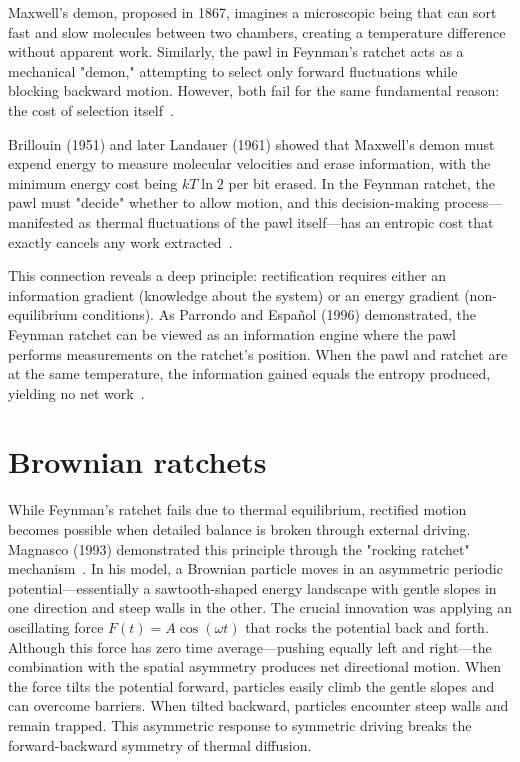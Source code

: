 Maxwell's demon, proposed in 1867, imagines a microscopic being that can sort fast and slow molecules between two chambers, creating a temperature difference without apparent work. Similarly, the pawl in Feynman's ratchet acts as a mechanical "demon," attempting to select only forward fluctuations while blocking backward motion. However, both fail for the same fundamental reason: the cost of selection itself~\cite{maxwell1871theory, maxwell1867letter}.

Brillouin (1951) and later Landauer (1961) showed that Maxwell's demon must expend energy to measure molecular velocities and erase information, with the minimum energy cost being $kT\ln{2}$ per bit erased. In the Feynman ratchet, the pawl must "decide" whether to allow motion, and this decision-making process—manifested as thermal fluctuations of the pawl itself—has an entropic cost that exactly cancels any work extracted~\cite{brillouin1951maxwell, landauer1961irreversibility}.

This connection reveals a deep principle: rectification requires either an information gradient (knowledge about the system) or an energy gradient (non-equilibrium conditions). As Parrondo and Español (1996) demonstrated, the Feynman ratchet can be viewed as an information engine where the pawl performs measurements on the ratchet's position. When the pawl and ratchet are at the same temperature, the information gained equals the entropy produced, yielding no net work~\cite{parrondo1996criticism}.


\section{Brownian ratchets}
\label{sct:brownianratchets}

While Feynman's ratchet fails due to thermal equilibrium, rectified motion becomes possible when detailed balance is broken through external driving. Magnasco (1993) demonstrated this principle through the "rocking ratchet" mechanism~\cite{magnasco1993forced}. In his model, a Brownian particle moves in an asymmetric periodic potential—essentially a sawtooth-shaped energy landscape with gentle slopes in one direction and steep walls in the other.
The crucial innovation was applying an oscillating force $F(t) = A\cos(\omega t)$ that rocks the potential back and forth. Although this force has zero time average—pushing equally left and right—the combination with the spatial asymmetry produces net directional motion. When the force tilts the potential forward, particles easily climb the gentle slopes and can overcome barriers. When tilted backward, particles encounter steep walls and remain trapped. This asymmetric response to symmetric driving breaks the forward-backward symmetry of thermal diffusion.

